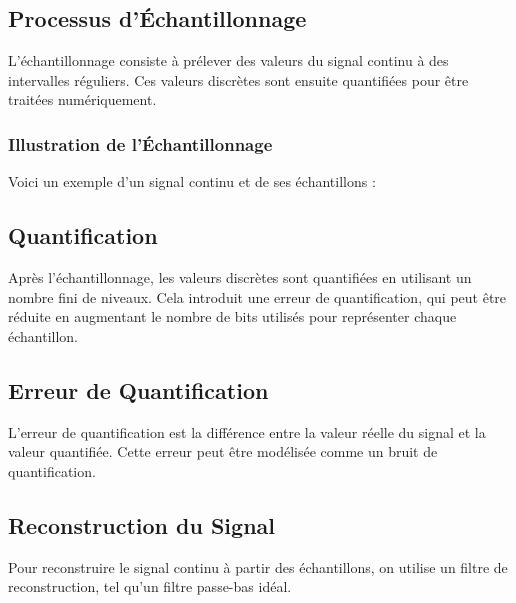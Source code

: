 \documentclass[10pt,a4paper]{article}
\begin{document}
\subsection*{Processus d'Échantillonnage}
L'échantillonnage consiste à prélever des valeurs du signal continu à des intervalles réguliers. Ces valeurs discrètes sont ensuite quantifiées pour être traitées numériquement.

\subsubsection*{Illustration de l'Échantillonnage}
Voici un exemple d'un signal continu et de ses échantillons :


\subsection*{Quantification}
Après l'échantillonnage, les valeurs discrètes sont quantifiées en utilisant un nombre fini de niveaux. Cela introduit une erreur de quantification, qui peut être réduite en augmentant le nombre de bits utilisés pour représenter chaque échantillon.

\subsection*{Erreur de Quantification}
L'erreur de quantification est la différence entre la valeur réelle du signal et la valeur quantifiée. Cette erreur peut être modélisée comme un bruit de quantification.

\subsection*{Reconstruction du Signal}
Pour reconstruire le signal continu à partir des échantillons, on utilise un filtre de reconstruction, tel qu'un filtre passe-bas idéal.
\end{document}
